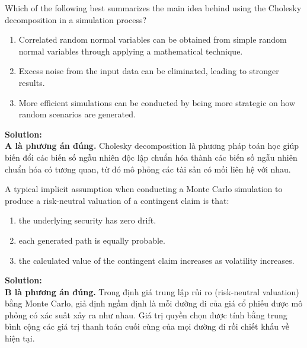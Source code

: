 \begin{tcolorbox}[
	colback=gray!5!white,
	colframe=black!15!white,
	boxrule=0.5pt,
	arc=3pt,
	title=\textbf{Question 3},
	coltitle=black,
	colbacktitle=black!5!white,
	before skip=6pt,
	after skip=6pt,
	breakable
]
Which of the following best summarizes the main idea behind using the Cholesky decomposition in a simulation process?
\begin{enumerate}[label=\Alph*.]
	\item Correlated random normal variables can be obtained from simple random normal variables through applying a mathematical technique.
	\item Excess noise from the input data can be eliminated, leading to stronger results.
	\item More efficient simulations can be conducted by being more strategic on how random scenarios are generated.
\end{enumerate}

\textbf{Solution:} \\
\textbf{A là phương án đúng.} Cholesky decomposition là phương pháp toán học giúp biến đổi các biến số ngẫu nhiên độc lập chuẩn hóa thành các biến số ngẫu nhiên chuẩn hóa có tương quan, từ đó mô phỏng các tài sản có mối liên hệ với nhau.
\end{tcolorbox}

\begin{tcolorbox}[
	colback=gray!5!white,
	colframe=black!15!white,
	boxrule=0.5pt,
	arc=3pt,
	title=\textbf{Question 4},
	coltitle=black,
	colbacktitle=black!5!white,
	before skip=6pt,
	after skip=6pt,
	breakable
]
A typical implicit assumption when conducting a Monte Carlo simulation to produce a risk-neutral valuation of a contingent claim is that:
\begin{enumerate}[label=\Alph*.]
	\item the underlying security has zero drift.
	\item each generated path is equally probable.
	\item the calculated value of the contingent claim increases as volatility increases.
\end{enumerate}

\textbf{Solution:} \\
\textbf{B là phương án đúng.} Trong định giá trung lập rủi ro (risk-neutral valuation) bằng Monte Carlo, giả định ngầm định là mỗi đường đi của giá cổ phiếu được mô phỏng có xác suất xảy ra như nhau. Giá trị quyền chọn được tính bằng trung bình cộng các giá trị thanh toán cuối cùng của mọi đường đi rồi chiết khấu về hiện tại.
\end{tcolorbox}

